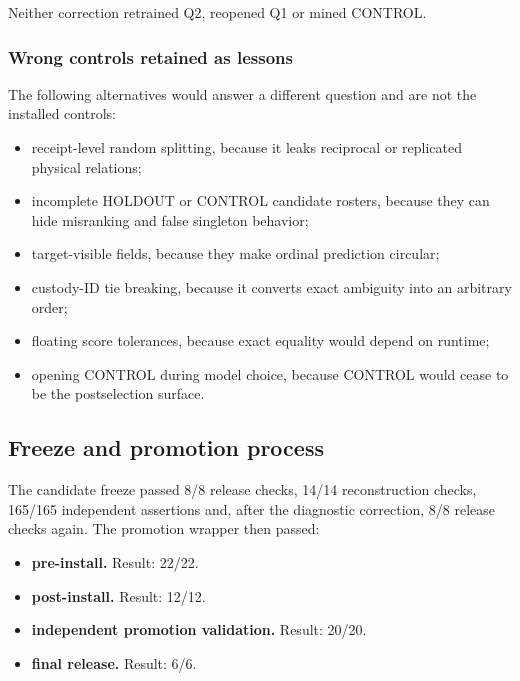 Neither correction retrained Q2, reopened Q1 or mined CONTROL.

\subsubsection{Wrong controls retained as
lessons}\label{viii-ch07-wrong-controls-retained-as-lessons}

The following alternatives would answer a different question and are not
the installed controls:

\begin{itemize}
\tightlist
\item
  receipt-level random splitting, because it leaks reciprocal or
  replicated physical relations;
\item
  incomplete HOLDOUT or CONTROL candidate rosters, because they can hide
  misranking and false singleton behavior;
\item
  target-visible fields, because they make ordinal prediction circular;
\item
  custody-ID tie breaking, because it converts exact ambiguity into an
  arbitrary order;
\item
  floating score tolerances, because exact equality would depend on
  runtime;
\item
  opening CONTROL during model choice, because CONTROL would cease to be
  the postselection surface.
\end{itemize}

\subsection{Freeze and promotion
process}\label{viii-ch07-freeze-and-promotion-process}

The candidate freeze passed 8/8 release checks, 14/14 reconstruction
checks, 165/165 independent assertions and, after the diagnostic
correction, 8/8 release checks again. The promotion wrapper then passed:

\begin{itemize}
\tightlist
\item
  \textbf{pre-install.} Result: 22/22.
\item
  \textbf{post-install.} Result: 12/12.
\item
  \textbf{independent promotion validation.} Result: 20/20.
\item
  \textbf{final release.} Result: 6/6.
\end{itemize}

